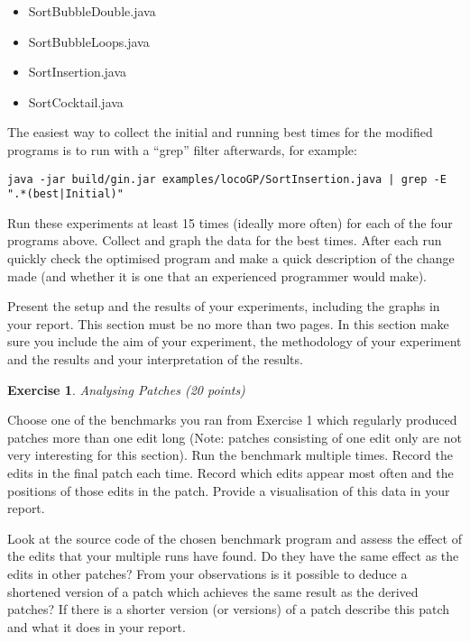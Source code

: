 \documentclass{pracs}
\newtheorem{exercise}{Exercise}
\begin{document}
\begin{itemize}
\item SortBubbleDouble.java
\item SortBubbleLoops.java
\item SortInsertion.java
\item SortCocktail.java
\end{itemize}

The easiest way to collect the initial and running best times for the modified programs is to run with a “grep” filter afterwards, for example:

{\small{\verb+java -jar build/gin.jar examples/locoGP/SortInsertion.java | grep -E ".*(best|Initial)"+}}

Run these experiments at least 15 times (ideally more often) for each of the four programs above. Collect and graph the data for the best times. After each run quickly check the optimised program and make a quick description of the change made (and whether it is one that an experienced programmer would make). 

Present the setup and the results of your experiments, including the graphs in your report. This section must be no more than two pages. In this section make sure you include the aim of your experiment, the methodology of your experiment and the results and your interpretation of the results.






\begin{exercise}
Analysing Patches (20 points)
\end{exercise}

Choose one of the benchmarks you ran from Exercise 1 which regularly produced patches more than one edit long (Note: patches consisting of one edit only are not very interesting for this section). Run the benchmark multiple times. Record the edits in the final patch each time. Record which edits appear most often and the positions of those edits in the patch. Provide a visualisation of this data in your report. 

Look at the source code of the chosen benchmark program and assess the effect of the edits that your multiple runs have found. Do they have the same effect as the edits in other patches? From your observations is it possible to deduce a shortened version of a patch which achieves the same result as the derived patches? If there is a shorter version (or versions) of a patch describe this patch and what it does in your report.
\end{document}
